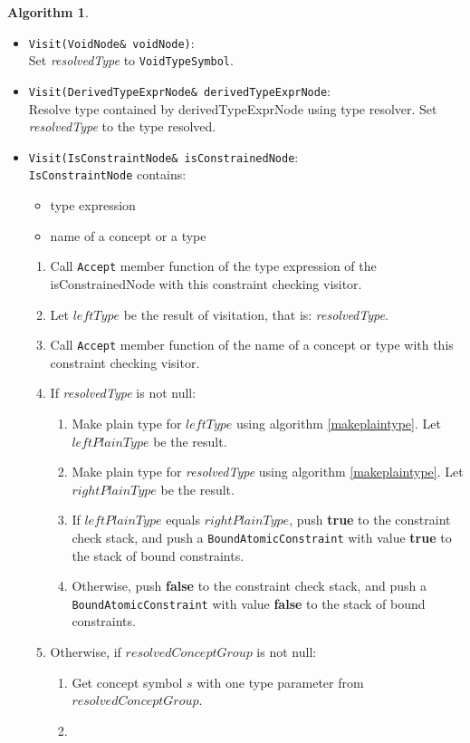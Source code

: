 \documentclass[a4paper,oneside,11pt]{book}
\theoremstyle{definition}
\newtheorem{algo}{Algorithm}[section]
\begin{document}
\begin{algo}
\begin{itemize}
\item
\verb|Visit(VoidNode& voidNode)|:\\
Set \emph{resolvedType} to \verb|VoidTypeSymbol|.
\item
\verb|Visit(DerivedTypeExprNode& derivedTypeExprNode|:\\
Resolve type contained by derivedTypeExprNode using type resolver.
Set \emph{resolvedType} to the type resolved.
\item
\verb|Visit(IsConstraintNode& isConstrainedNode|:\\
\verb|IsConstraintNode| contains:
\begin{itemize}
\item
type expression
\item
name of a concept or a type
\end{itemize}
\begin{enumerate}
\item
Call \verb|Accept| member function of the type expression of the isConstrainedNode with this constraint checking visitor.
\item
Let $leftType$ be the result of visitation, that is: \emph{resolvedType}.
\item
Call \verb|Accept| member function of the name of a concept or type with this constraint checking visitor.
\item
If \emph{resolvedType} is not null:
\begin{enumerate}
\item
Make plain type for $leftType$ using algorithm \ref{makeplaintype}. Let $leftPlainType$ be the result.
\item
Make plain type for \emph{resolvedType} using algorithm \ref{makeplaintype}. Let $rightPlainType$ be the result.
\item
If $leftPlainType$ equals $rightPlainType$, push \textbf{true} to the constraint check stack,
and push a \verb|BoundAtomicConstraint| with value \textbf{true} to the stack of bound constraints.
\item
Otherwise, push \textbf{false} to the constraint check stack,
and push a \verb|BoundAtomicConstraint| with value \textbf{false} to the stack of bound constraints.
\end{enumerate}
\item
Otherwise, if $resolvedConceptGroup$ is not null:
\begin{enumerate}
\item
Get concept symbol $s$ with one type parameter from $resolvedConceptGroup$.
\item

\end{enumerate}
\end{enumerate}
\end{itemize}
\end{algo}
\end{document}
